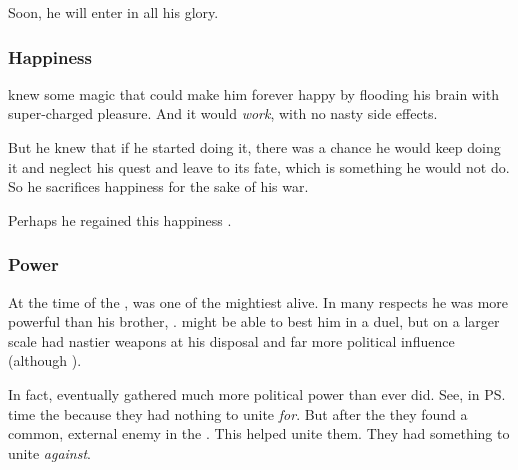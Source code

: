 Soon, he will enter \Miith{} in all his glory.






\subsubsection{Happiness}
\Secherdamon{} knew some magic that could make him forever happy by flooding his brain with super-charged pleasure. 
And it would \emph{work}, with no nasty side effects. 

But he knew that if he started doing it, there was a chance he would keep doing it and neglect his quest and leave \Miith{} to its fate, which is something he would not do. 
So he sacrifices happiness for the sake of his war. 

Perhaps he regained this happiness . 





\subsubsection{Power}
At the time of the , \Secherdamon{} was one of the mightiest \dragons{} alive. 
In many respects he was more powerful than his brother, \Ishnaruchaefir. 
\Ishnaruchaefir{} might be able to best him in a duel, but on a larger scale \Secherdamon{} had nastier weapons at his disposal and far more political influence (although ). 

In fact, \Secherdamon{} eventually gathered much more political power than \Nexagglachel{} ever did. 
See, in \ps{\Nexagglachel} time the  because they had nothing to unite \emph{for}. 
But after the \secondbanewar{} they found a common, external enemy in the \resphain.
This helped \Secherdamon{} unite them. 
They had something to unite \emph{against}. 









